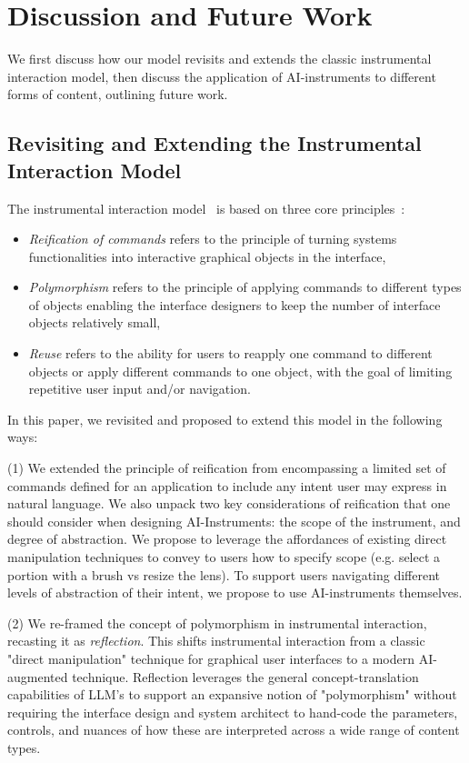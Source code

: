 \section{Discussion and Future Work}

We first discuss how our model revisits and extends the classic instrumental interaction model, then discuss the application of AI-instruments to different forms of content, outlining future work.

\subsection{Revisiting and Extending the Instrumental Interaction Model}

The instrumental interaction model~\cite{beaudouin2000instrumental} is based on three core principles~\cite{beaudouin2000reification}:
\begin{itemize}
    \item \textit{Reification of commands} refers to the principle of turning systems functionalities into interactive graphical objects in the interface,
    \item \textit{Polymorphism} refers to the principle of applying commands to different types of objects enabling the interface designers to keep the number of interface objects relatively small, 
    \item \textit{Reuse} refers to the ability for users to reapply one command to different objects or apply different commands to one object, with the goal of limiting repetitive user input and/or navigation.
\end{itemize}

In this paper, we revisited and proposed to extend this model in the following ways:

(1) We extended the principle of reification from encompassing a limited set of commands defined for an application to include any intent user may express in natural language. We also unpack two key considerations of reification that one should consider when designing AI-Instruments: the scope of the instrument, and degree of abstraction. We propose to leverage the affordances of existing direct manipulation techniques to convey to users how to specify scope (e.g. select a portion with a brush vs resize the lens). To support users navigating different levels of abstraction of their intent, we propose to use AI-instruments themselves.


(2) We re-framed the concept of polymorphism in instrumental interaction, recasting it as \textit{reflection}. This shifts instrumental interaction from a classic "direct manipulation" technique for graphical user interfaces to a modern AI-augmented technique. Reflection leverages the general concept-translation capabilities of LLM's to support an expansive notion of "polymorphism" without requiring the interface design and system architect to hand-code the parameters, controls, and nuances of how these are interpreted across a wide range of content types. 

